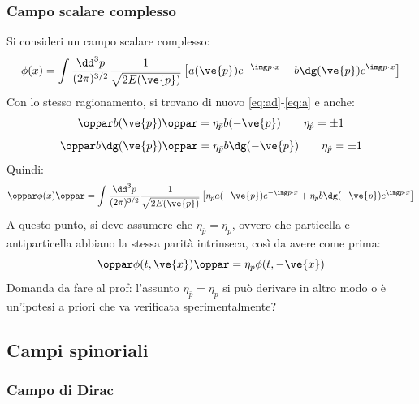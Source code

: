 \subsubsection{Campo scalare complesso}

Si consideri un campo scalare complesso:
\begin{equation*}
  \phi(x) = \int \frac{\dd^3p}{(2\pi)^{3/2}} \frac{1}{\sqrt{2E(\ve{p})}} \left[ a(\ve{p}) e^{-\img p \cdot x} + b\dg(\ve{p}) e^{\img p \cdot x} \right]
\end{equation*}
Con lo stesso ragionamento, si trovano di nuovo \ref{eq:ad}-\ref{eq:a} e anche:
\begin{equation}
  \oppar b(\ve{p}) \oppar = \eta_{\bar{p}} b(-\ve{p})
  \qquad
  \eta_{\hat{p}} = \pm 1
  \label{eq:b}
\end{equation}
\begin{equation}
  \oppar b\dg(\ve{p}) \oppar = \eta_{\bar{p}} b\dg(-\ve{p})
  \qquad
  \eta_{\hat{p}} = \pm 1
  \label{eq:bd}
\end{equation}
Quindi:
\begin{equation*}
    \oppar \phi(x) \oppar = \int \frac{\dd^3p}{(2\pi)^{3/2}} \frac{1}{\sqrt{2E(\ve{p})}} \left[ \eta_p a(-\ve{p}) e^{-\img p \cdot x} + \eta_{\bar{p}} b\dg(-\ve{p}) e^{\img p \cdot x} \right]
\end{equation*}
A questo punto, si deve assumere che $ \eta_{\bar{p}} = \eta_p $, ovvero che particella e antiparticella abbiano la stessa parità intrinseca, così da avere come prima:
\begin{equation}
  \oppar \phi(t,\ve{x}) \oppar = \eta_p \phi(t,-\ve{x})
\end{equation}
Domanda da fare al prof: l'assunto $ \eta_{\bar{p}} = \eta_p $ si può derivare in altro modo o è un'ipotesi a priori che va verificata sperimentalmente?

\subsection{Campi spinoriali}

\subsubsection{Campo di Dirac}

